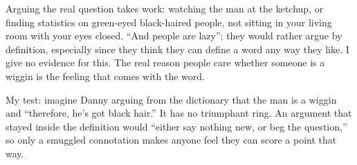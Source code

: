 Arguing the real question takes work: watching the man at the ketchup, or finding statistics on green-eyed black-haired people, not sitting in your living room with your eyes closed. ``And people are lazy''; they would rather argue by definition, especially since they think they can define a word any way they like. I give no evidence for this. The real reason people care whether someone is a wiggin is the feeling that comes with the word.

My test: imagine Danny arguing from the dictionary that the man is a wiggin and ``therefore, he's got black hair.'' It has no triumphant ring. An argument that stayed inside the definition would ``either say nothing new, or beg the question,'' so only a smuggled connotation makes anyone feel they can score a point that way. 
